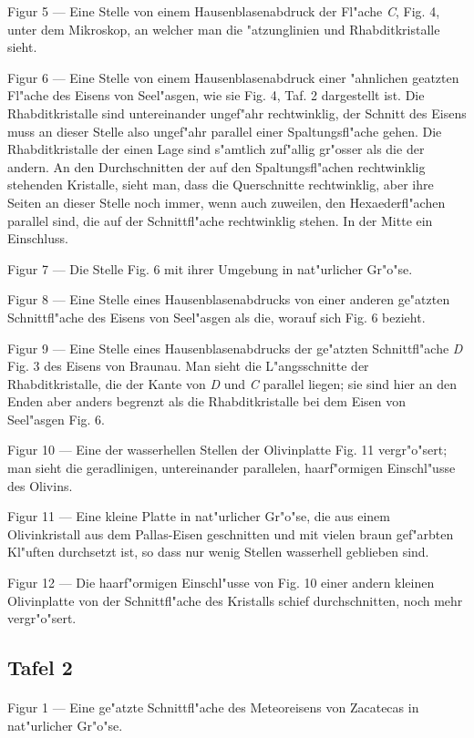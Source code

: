 \documentclass[a4paper, 11pt, oneside, german]{article}
\begin{document}
Figur 5 --- Eine Stelle von einem Hausenblasenabdruck der Fl"ache \emph{C}, Fig. 4, unter dem Mikroskop, an welcher man die "atzunglinien und Rhabditkristalle sieht.

Figur 6 --- Eine Stelle von einem Hausenblasenabdruck einer "ahnlichen geatzten Fl"ache des Eisens von Seel"asgen, wie sie Fig. 4, Taf. 2 dargestellt ist. Die Rhabditkristalle sind untereinander ungef"ahr rechtwinklig, der Schnitt des Eisens muss an dieser Stelle also ungef"ahr parallel einer Spaltungsfl"ache gehen. Die Rhabditkristalle der einen Lage sind s"amtlich zuf"allig gr"osser als die der andern. An den Durchschnitten der auf den Spaltungsfl"achen rechtwinklig stehenden Kristalle, sieht man, dass die Querschnitte rechtwinklig, aber ihre Seiten an dieser Stelle noch immer, wenn auch zuweilen, den Hexaederfl"achen parallel sind, die auf der Schnittfl"ache rechtwinklig stehen. In der Mitte ein Einschluss.

Figur 7 --- Die Stelle Fig. 6 mit ihrer Umgebung in nat"urlicher Gr"o"se.

Figur 8 --- Eine Stelle eines Hausenblasenabdrucks von einer anderen ge"atzten Schnittfl"ache des Eisens von Seel"asgen als die, worauf sich Fig. 6 bezieht.

Figur 9 --- Eine Stelle eines Hausenblasenabdrucks der ge"atzten Schnittfl"ache \emph{D} Fig. 3 des Eisens von Braunau. Man sieht die L"angsschnitte der Rhabditkristalle, die der Kante von \emph{D} und \emph{C} parallel liegen; sie sind hier an den Enden aber anders begrenzt als die Rhabditkristalle bei dem Eisen von Seel"asgen Fig. 6.

Figur 10 --- Eine der wasserhellen Stellen der Olivinplatte Fig. 11 vergr"o"sert; man sieht die geradlinigen, untereinander parallelen, haarf"ormigen Einschl"usse des Olivins.

Figur 11 --- Eine kleine Platte in nat"urlicher Gr"o"se, die aus einem Olivinkristall aus dem Pallas-Eisen geschnitten und mit vielen braun gef"arbten Kl"uften durchsetzt ist, so dass nur wenig Stellen wasserhell geblieben sind.

Figur 12 --- Die haarf"ormigen Einschl"usse von Fig. 10 einer andern kleinen Olivinplatte von der Schnittfl"ache des Kristalls schief durchschnitten, noch mehr vergr"o"sert.

\subsection{Tafel 2}
\paragraph{}
Figur 1 --- Eine ge"atzte Schnittfl"ache des Meteoreisens von Zacatecas in nat"urlicher Gr"o"se.
\end{document}
